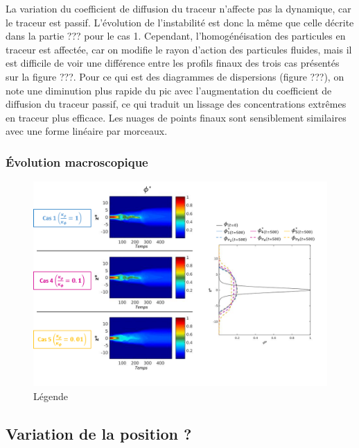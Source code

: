 \documentclass[a4paper,12pt]{article}
\begin{document}
    La variation du coefficient de diffusion du traceur n'affecte pas la dynamique, car le traceur est passif. L'évolution de l'instabilité est donc la même que celle décrite dans la partie ??? pour le cas 1. Cependant, l'homogénéisation des particules en traceur est affectée, car on modifie le rayon d'action des particules fluides, mais il est difficile de voir une différence entre les profils finaux des trois cas présentés sur la figure ???. Pour ce qui est des diagrammes de dispersions (figure ???), on note une diminution plus rapide du pic avec l'augmentation du coefficient de diffusion du traceur passif, ce qui traduit un lissage des concentrations extrêmes en traceur plus efficace. Les nuages de points finaux sont sensiblement similaires avec une forme linéaire par morceaux.
    
    \subsubsection{Évolution macroscopique}
    
    \begin{figure}[!h]
        \centering
        \label{scatterplot_phi}
        \includegraphics[width=1\linewidth]{figures/phidiff_star.png}
        \caption{Légende}
    \end{figure}
    
  \subsection{Variation de la position ?}



\newpage
\end{document}
